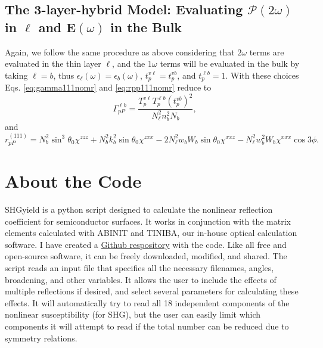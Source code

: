 
\subsection{The 3-layer-hybrid Model: Evaluating
\texorpdfstring{$\boldsymbol{\mathcal{P}}(2\omega)$ in $\ell$}{P(2w) in l} and
\texorpdfstring{$\mathbf{E}(\omega)$}{E(w)} in the Bulk}
\label{sec:3-layer-hybrid}

Again, we follow the same procedure as above considering that $2\omega$ terms
are evaluated in the thin layer $\ell$, and the $1\omega$ terms will be
evaluated in the bulk by taking $\ell = b$, thus $\epsilon_{\ell}(\omega) =
\epsilon_{b}(\omega)$, $t^{v\ell}_{p} = t^{vb}_{p}$, and $t^{\ell b}_{p} = 1$.
With these choices Eqs. \eqref{eq:gamma111nomr} and \eqref{eq:rpp111nomr} reduce
to
\begin{equation}
\Gamma^{\ell b}_{pP}=
\frac{T^{v\ell}_{p}T^{\ell b}_{p}\left(t^{vb}_{p}\right)^{2}}
  {N^{2}_{\ell}n^{2}_{b}N_{b}},
\end{equation}
and
\begin{equation}
r^{(111)}_{pP} = 
  N^{2}_{b}\sin^{3}\theta_{0}\chi^{zzz}
+ N^{2}_{b}k^{2}_{b}\sin\theta_{0}\chi^{zxx}
- 2N^{2}_{\ell}w_{b}W_{b}\sin\theta_{0}\chi^{xxz}
- N^{2}_{\ell}w^{2}_{b}W_{b}\chi^{xxx}\cos3\phi.
\end{equation}



\section{About the Code}

SHGyield is a python script designed to calculate the nonlinear reflection
coefficient for semiconductor surfaces. It works in conjunction with the matrix
elements calculated with ABINIT and TINIBA, our in-house optical calculation
software. I have created a 
\href{https://github.com/roguephysicist/SHGYield}{Github respository}
with the code. Like all free and open-source software, it can be freely
downloaded, modified, and shared. The script reads an input file that specifies
all the necessary filenames, angles, broadening, and other variables. It allows
the user to include the effects of multiple reflections if desired, and select
several parameters for calculating these effects. It will automatically try to
read all 18 independent components of the nonlinear susceptibility (for SHG),
but the user can easily limit which components it will attempt to read if the
total number can be reduced due to symmetry relations.

